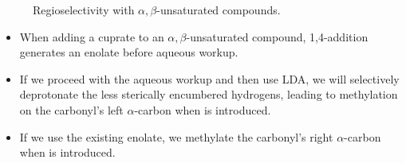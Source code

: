 \documentclass[../notes.tex]{subfiles}
\begin{document}
\begin{itemize}
\begin{figure}[h!]
        \caption{Regioselectivity with $\alpha,\beta$-unsaturated compounds.}
        \label{fig:regioselectivityAlphaBeta}
    \end{figure}
    \begin{itemize}
        \item When adding a cuprate to an $\alpha,\beta$-unsaturated compound, 1,4-addition generates an enolate before aqueous workup.
        \item If we proceed with the aqueous workup and then use LDA, we will selectively deprotonate the less sterically encumbered hydrogens, leading to methylation on the carbonyl's left $\alpha$-carbon when  is introduced.
        \item If we use the existing enolate, we methylate the carbonyl's right $\alpha$-carbon when  is introduced.
    \end{itemize}
\end{itemize}
\end{document}
